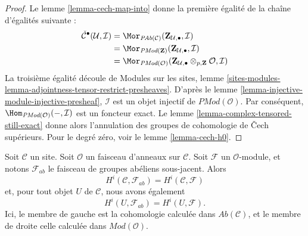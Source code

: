 \begin{proof}
Le lemme \ref{lemma-cech-map-into} donne la première égalité de la chaîne
d'égalités suivante :
\begin{align*}
\check{\mathcal{C}}^\bullet(\mathcal{U}, \mathcal{I})
& =
\Mor_{\textit{PAb}(\mathcal{C})}(
\mathbf{Z}_{\mathcal{U}, \bullet}, \mathcal{I}) \\
& =
\Mor_{\textit{PMod}(\mathbf{Z})}(
\mathbf{Z}_{\mathcal{U}, \bullet}, \mathcal{I}) \\
& =
\Mor_{\textit{PMod}(\mathcal{O})}(
\mathbf{Z}_{\mathcal{U}, \bullet} \otimes_{p, \mathbf{Z}} \mathcal{O},
\mathcal{I})
\end{align*}
La troisième égalité découle de Modules sur les sites,
lemme \ref{sites-modules-lemma-adjointness-tensor-restrict-presheaves}.
D'après le lemme \ref{lemma-injective-module-injective-presheaf},
$\mathcal{I}$ est un objet injectif de $\textit{PMod}(\mathcal{O})$.
Par conséquent, $\Hom_{\textit{PMod}(\mathcal{O})}(-, \mathcal{I})$ est un
foncteur exact. Le lemme \ref{lemma-complex-tensored-still-exact} donne alors
l'annulation des groupes de cohomologie de {\v C}ech supérieurs.
Pour le degré zéro, voir le lemme \ref{lemma-cech-h0}.
\end{proof}

\begin{lemma}
\label{lemma-cohomology-modules-abelian-agree}
Soit $\mathcal{C}$ un site.
Soit $\mathcal{O}$ un faisceau d'anneaux sur $\mathcal{C}$.
Soit $\mathcal{F}$ un $\mathcal{O}$-module, et notons $\mathcal{F}_{ab}$ le
faisceau de groupes abéliens sous-jacent. Alors
$$
H^i(\mathcal{C}, \mathcal{F}_{ab})
=
H^i(\mathcal{C}, \mathcal{F})
$$
et, pour tout objet $U$ de $\mathcal{C}$, nous avons également
$$
H^i(U, \mathcal{F}_{ab})
=
H^i(U, \mathcal{F}).
$$
Ici, le membre de gauche est la cohomologie calculée dans
$\textit{Ab}(\mathcal{C})$, et le membre de droite celle calculée dans
$\textit{Mod}(\mathcal{O})$.
\end{lemma}

